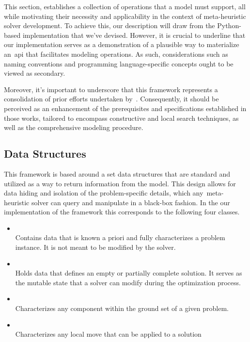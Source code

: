 This section, establishes a collection of operations that a model must
support, all while motivating their necessity and applicability in the
context of meta-heuristic solver development. To achieve this, our description
will draw from the Python-based implementation that we've devised. However, it is
crucial to underline that our implementation serves as a demonstration of a
plausible way to materialize an~\acrshort{api} that facilitates modeling
operations. As such, considerations such as naming conventions and programming
language-specific concepts ought to be viewed as secondary.

Moreover, it's important to underscore that this framework represents a
consolidation of prior efforts undertaken by~\citet{vieira2009uma,
  fonseca2021nasf4nio, outeiro2021application}.  Consequently, it should be
perceived as an enhancement of the prerequisites and specifications established
in those works, tailored to encompass constructive and local search techniques,
as well as the comprehensive modeling procedure.

\subsection{Data Structures}

This framework is based around a set data structures that are standard and
utilized as a way to return information from the model. This design allows for
data hiding and isolation of the problem-specific details, which
any~\acrshort{meta-heuristic} solver can query and manipulate in a black-box
fashion. In the our implementation of the framework this corresponds to the
following four classes.

\begin{itemize}
  \item {}\\
        Contains data that is known a priori and fully characterizes
        a problem instance. It is not meant to be modified by the solver.

  \item {}\\
        Holds data that defines an empty or partially
        complete solution. It serves as the mutable state that a solver can
        modify during the optimization process.

  \item {}\\
        Characterizes any component within the ground set of a given problem.

  \item {}\\
        Characterizes any local move that can be applied to a solution
\end{itemize}

